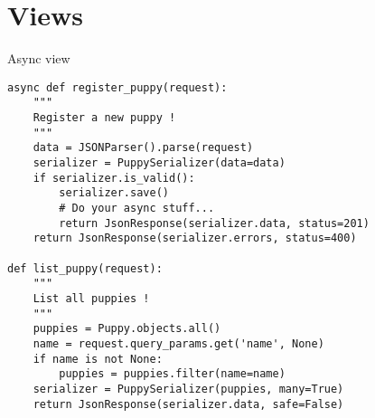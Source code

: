 \section{Views}
\begin{frame}[fragile]{Async view}
    \begin{verbatim}
async def register_puppy(request):
    """
    Register a new puppy !
    """
    data = JSONParser().parse(request)
    serializer = PuppySerializer(data=data)
    if serializer.is_valid():
        serializer.save()
        # Do your async stuff...
        return JsonResponse(serializer.data, status=201)
    return JsonResponse(serializer.errors, status=400)

def list_puppy(request):
    """
    List all puppies !
    """
    puppies = Puppy.objects.all()
    name = request.query_params.get('name', None)
    if name is not None:
        puppies = puppies.filter(name=name)
    serializer = PuppySerializer(puppies, many=True)
    return JsonResponse(serializer.data, safe=False)
    \end{verbatim}
\end{frame}


